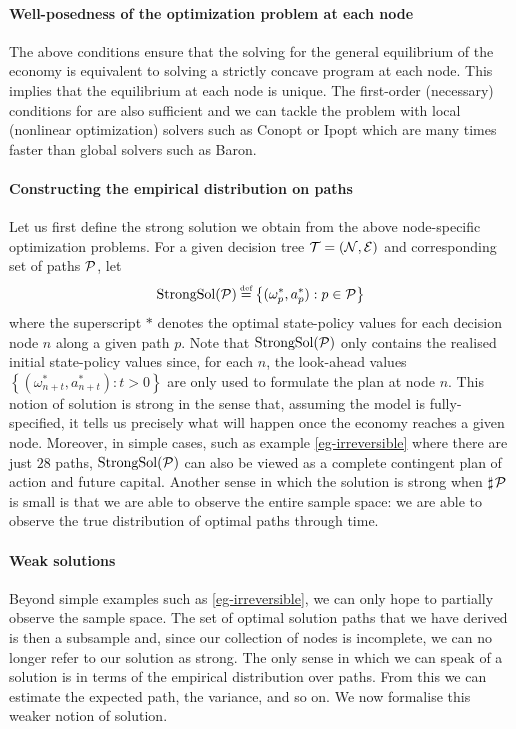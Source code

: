\documentclass[12pt,a4paper,twoside, draft]{article}
\begin{document}
\paragraph{Well-posedness of the optimization problem at each node}
The above conditions ensure that the solving for the general equilibrium of the
economy is equivalent to solving a strictly concave program at each node.
This implies that the equilibrium at each node is unique.
The first-order (necessary) conditions for are also sufficient and we can
tackle the problem with local (nonlinear optimization) solvers such as Conopt
or Ipopt which are many times faster than global solvers such as Baron.

\paragraph{Constructing the empirical distribution on paths}
Let us first define the strong solution we obtain from the above node-specific
optimization problems.
For a given decision tree $\mathcal T = (\mathcal N, \mathcal E)$ and corresponding set of
paths $\mathcal P$, let
\[
   \textup{StrongSol}(\mc P) \defeq \left\{
      (\omega^{*}_{p}, a^{*}_{p}) : p \in \mc P
   \right\}
\]
where the superscript $*$ denotes the optimal state-policy values
for each decision node $n$ along a given path $p$.
Note that $\textup{StrongSol}(\mathcal P)$ only contains the realised initial
state-policy values since, for each $n$, the look-ahead values
$\left\{(\omega^{*}_{n + t}, a^{*}_{n + t}) : t > 0 \right\}$ are only used to
formulate the plan at node $n$.
This notion of solution is strong in the sense that, assuming the model is
fully-specified, it tells us precisely what will happen once the economy
reaches a given node.
Moreover, in simple cases, such as example \ref{eg-irreversible} where there
are just $28$ paths, $\textup{StrongSol}(\mathcal P)$ can also be viewed as a
complete contingent plan of action and future capital.
Another sense in which the solution is strong when $\mathbin{\sharp}\hskip1pt \mathcal P$
is small is that we are able to observe the entire sample space: we are able to
observe the true distribution of optimal paths through time.

\paragraph{Weak solutions}
Beyond simple examples such as \cref{eg-irreversible}, we can only hope to
partially observe the sample space.
The set of optimal solution paths that we have derived is then a subsample and,
since our collection of nodes is incomplete, we can no longer refer to our
solution as strong.
The only sense in which we can speak of a solution is in terms of the empirical
distribution over paths. 
From this we can estimate the expected path, the variance, and so on.
We now formalise this weaker notion of solution.
\end{document}
